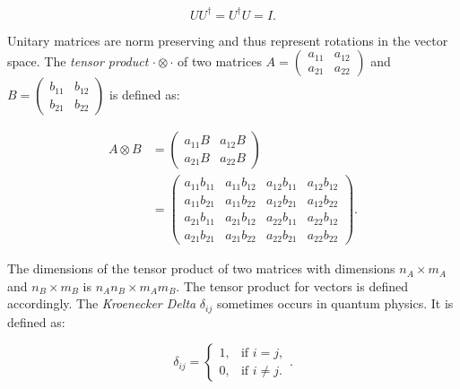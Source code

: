 \begin{equation}
   U U^{\dagger} = U^{\dagger}U = I.
\end{equation}

Unitary matrices are norm preserving and thus represent rotations in the vector space.
The \textit{tensor product} $\cdot \otimes \cdot$ of two matrices $A=\begin{pmatrix}
   a_{11} & a_{12} \\ a_{21} & a_{22}
\end{pmatrix}$ and $B= \begin{pmatrix}
   b_{11} & b_{12} \\ b_{21} & b_22
\end{pmatrix}$ is defined as:

\begin{align}
   A \otimes B &= \begin{pmatrix}
      a_{11} B & a_{12} B \\ a_{21} B & a_{22} B
   \end{pmatrix} \\
   &= \begin{pmatrix}
      a_{11} b_{11} & a_{11} b_{12} & a_{12} b_{11} & a_{12} b_{12} \\
      a_{11} b_{21} & a_{11} b_{22} & a_{12} b_{21} & a_{12} b_{22} \\ 
      a_{21} b_{11} & a_{21} b_{12} & a_{22} b_{11} & a_{22} b_{12} \\
      a_{21} b_{21} & a_{21} b_{22} & a_{22} b_{21} & a_{22} b_{22}
   \end{pmatrix}.
\end{align}

The dimensions of the tensor product of two matrices with dimensions $n_A \times m_A$ and $n_B \times m_B$ 
is $n_An_B \times m_Am_B$. The tensor product for vectors is defined accordingly.
The \textit{Kroenecker Delta} $\delta_{ij}$ sometimes occurs in quantum physics. It is defined as:

\begin{equation}
   \delta_{ij} =
    \begin{cases}
            1, &         \text{if } i=j,\\
            0, &         \text{if } i\neq j.
    \end{cases}.
\end{equation}
